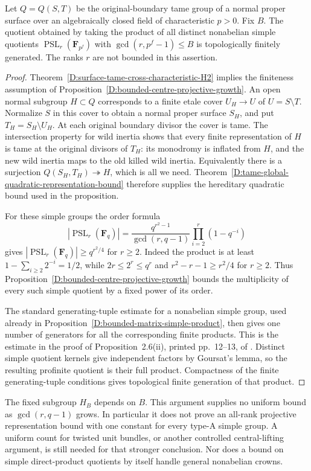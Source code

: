 \begin{corollary}
\label{D:surface-bounded-centre-simple-product}
Let $Q=Q(S,T)$ be the original-boundary tame group of a normal proper
surface over an algebraically closed field of characteristic $p>0$.
Fix $B$. The quotient obtained by taking the product
of all distinct nonabelian simple quotients
$\operatorname{PSL}_r(\mathbf F_{p^f})$ with
$\gcd(r,p^f-1)\le B$ is topologically finitely generated. The ranks
$r$ are not bounded in this assertion.
\end{corollary}
\begin{proof}
Theorem~\ref{D:surface-tame-cross-characteristic-H2} implies the
finiteness assumption of
Proposition~\ref{D:bounded-centre-projective-growth}. An open normal
subgroup $H\subset Q$ corresponds to a finite etale cover $U_H\to U$
of $U=S\setminus T$. Normalize $S$ in this cover to obtain a normal
proper surface $S_H$, and put $T_H=S_H\setminus U_H$. At each
original boundary divisor the cover is tame. The intersection
property for wild inertia shows that every finite representation
of $H$ is tame at the original divisors of $T_H$: its monodromy is
inflated from $H$, and the new wild inertia maps to the old killed
wild inertia. Equivalently there is a surjection
$Q(S_H,T_H)\twoheadrightarrow H$, which is all we need.
Theorem~\ref{D:tame-global-quadratic-representation-bound} therefore
supplies the hereditary quadratic bound used in the proposition.

For these simple groups the order formula
\[
 |\operatorname{PSL}_r(\mathbf F_q)|
 =\frac{q^{r^2-1}}{\gcd(r,q-1)}
       \prod_{i=2}^r(1-q^{-i})
\]
gives $|\operatorname{PSL}_r(\mathbf F_q)|\ge q^{r^2/4}$ for
$r\ge2$. Indeed the product is at least
$1-\sum_{i\ge2}2^{-i}=1/2$, while $2r\le2^r\le q^r$ and
$r^2-r-1\ge r^2/4$ for $r\ge2$. Thus Proposition~\ref{D:bounded-centre-projective-growth}
bounds the multiplicity of every such simple quotient by a fixed
power of its order.

The standard generating-tuple estimate for a nonabelian simple
group, used already in Proposition~\ref{D:bounded-matrix-simple-product},
then gives one number of generators for all the corresponding finite
products. This is the estimate in the proof of Proposition~2.6(ii),
printed pp.~12--13, of \citet{LucchiniMarionTracey2020D}.
Distinct simple quotient kernels give independent factors by
Goursat's lemma, so the resulting profinite quotient is their full
product. Compactness of the finite generating-tuple conditions
gives topological finite generation of that product.
\end{proof}

\begin{remark}
The fixed subgroup $H_B$ depends on $B$. This argument supplies no
uniform bound as $\gcd(r,q-1)$ grows. In particular it does not
prove an all-rank projective representation bound with one constant
for every type-A simple group. A uniform count for twisted unit
bundles, or another controlled central-lifting argument, is still
needed for that stronger conclusion. Nor does a bound on simple
direct-product quotients by itself handle general nonabelian crowns.
\end{remark}
